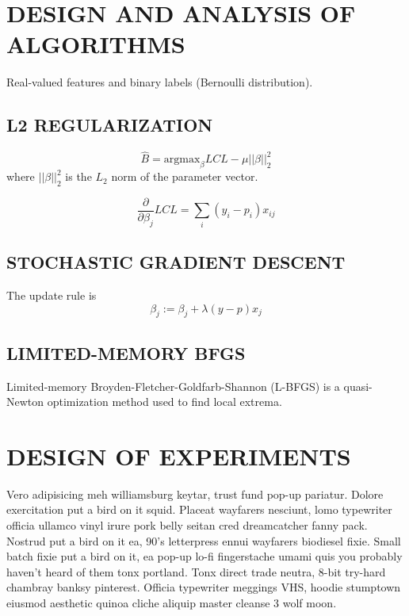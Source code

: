 \section{DESIGN AND ANALYSIS OF ALGORITHMS}
\label{sec:algorithms}

Real-valued features and binary labels (Bernoulli distribution).


\subsection{L2 REGULARIZATION}
\begin{equation}
    \hat{B} = \textrm{argmax}_{\beta} LCL - \mu||\beta||_2^2
\end{equation}
where $||\beta||_2^2$ is the $L_2$ norm of the parameter vector.


\begin{equation}
    \frac{\partial}{\partial \beta_j} LCL = \sum_i (y_i - p_i)x_{ij}
\end{equation}


\subsection{STOCHASTIC GRADIENT DESCENT}
The update rule is
\begin{equation}
    \beta_j := \beta_j + \lambda (y-p)x_j
\end{equation}


\subsection{LIMITED-MEMORY BFGS}
Limited-memory Broyden-Fletcher-Goldfarb-Shannon (L-BFGS) is a quasi-Newton
optimization method used to find local extrema.


\section{DESIGN OF EXPERIMENTS}
\label{sec:experiments}

Vero adipisicing meh williamsburg keytar, trust fund pop-up pariatur. Dolore exercitation put a bird on it squid. Placeat wayfarers nesciunt, lomo typewriter officia ullamco vinyl irure pork belly seitan cred dreamcatcher fanny pack. Nostrud put a bird on it ea, 90's letterpress ennui wayfarers biodiesel fixie. Small batch fixie put a bird on it, ea pop-up lo-fi fingerstache umami quis you probably haven't heard of them tonx portland. Tonx direct trade neutra, 8-bit try-hard chambray banksy pinterest. Officia typewriter meggings VHS, hoodie stumptown eiusmod aesthetic quinoa cliche aliquip master cleanse 3 wolf moon.



